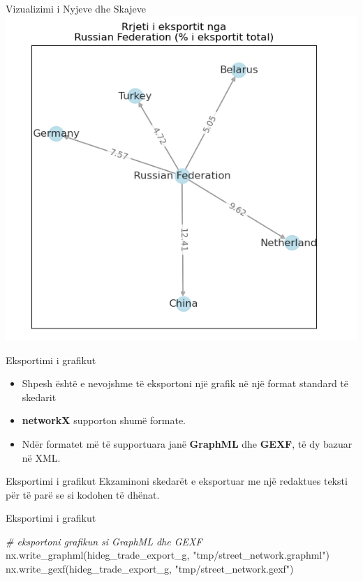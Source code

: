 \documentclass[
  ignorenonframetext,
]{beamer}
\newenvironment{Shaded}{\begin{snugshade}}{\end{snugshade}}
\newcommand{\CommentTok}[1]{\textcolor[rgb]{0.56,0.35,0.01}{\textit{#1}}}
\newcommand{\NormalTok}[1]{#1}
\newcommand{\StringTok}[1]{\textcolor[rgb]{0.31,0.60,0.02}{#1}}
\begin{document}
\begin{frame}{Vizualizimi i Nyjeve dhe Skajeve}
\protect\hypertarget{vizualizimi-i-nyjeve-dhe-skajeve-10}{}
\includegraphics{./Figs/difrrjet3.png}
\end{frame}

\begin{frame}{Eksportimi i grafikut}
\protect\hypertarget{eksportimi-i-grafikut}{}
\begin{itemize}
\item
  Shpesh është e nevojshme të eksportoni një grafik në një format
  standard të skedarit
\item
  \textbf{networkX} supporton shumë formate.
\item
  Ndër formatet më të supportuara janë \textbf{GraphML} dhe
  \textbf{GEXF}, të dy bazuar në XML.
\end{itemize}
\end{frame}

\begin{frame}{Eksportimi i grafikut}
\protect\hypertarget{eksportimi-i-grafikut-1}{}
Ekzaminoni skedarët e eksportuar me një redaktues teksti për të parë se
si kodohen të dhënat.
\end{frame}

\begin{frame}[fragile]{Eksportimi i grafikut}
\protect\hypertarget{eksportimi-i-grafikut-2}{}

\begin{Shaded}
\begin{Highlighting}[]
\CommentTok{\# eksportoni grafikun si GraphML dhe GEXF}
\NormalTok{nx.write\_graphml(hideg\_trade\_export\_g, }\StringTok{"tmp/street\_network.graphml"}\NormalTok{)}
\NormalTok{nx.write\_gexf(hideg\_trade\_export\_g, }\StringTok{"tmp/street\_network.gexf"}\NormalTok{)}
\end{Highlighting}
\end{Shaded}
\end{frame}
\end{document}
